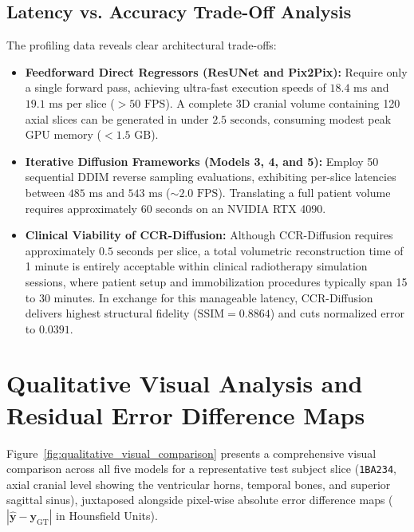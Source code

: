 \subsection{Latency vs. Accuracy Trade-Off Analysis}
The profiling data reveals clear architectural trade-offs:
\begin{itemize}
    \item \textbf{Feedforward Direct Regressors (ResUNet and Pix2Pix):} Require only a single forward pass, achieving ultra-fast execution speeds of $18.4\text{ ms}$ and $19.1\text{ ms}$ per slice ($> 50\text{ FPS}$). A complete 3D cranial volume containing 120 axial slices can be generated in under $2.5\text{ seconds}$, consuming modest peak GPU memory ($< 1.5\text{ GB}$).
    \item \textbf{Iterative Diffusion Frameworks (Models 3, 4, and 5):} Employ 50 sequential DDIM reverse sampling evaluations, exhibiting per-slice latencies between $485\text{ ms}$ and $543\text{ ms}$ ($\sim 2.0\text{ FPS}$). Translating a full patient volume requires approximately $60\text{ seconds}$ on an NVIDIA RTX 4090.
    \item \textbf{Clinical Viability of CCR-Diffusion:} Although CCR-Diffusion requires approximately $0.5\text{ seconds}$ per slice, a total volumetric reconstruction time of 1 minute is entirely acceptable within clinical radiotherapy simulation sessions, where patient setup and immobilization procedures typically span 15 to 30 minutes. In exchange for this manageable latency, CCR-Diffusion delivers highest structural fidelity ($\text{SSIM} = \mathbf{0.8864}$) and cuts normalized error to $\mathbf{0.0391}$.
\end{itemize}

\section{Qualitative Visual Analysis and Residual Error Difference Maps}
Figure~\ref{fig:qualitative_visual_comparison} presents a comprehensive visual comparison across all five models for a representative test subject slice (\texttt{1BA234}, axial cranial level showing the ventricular horns, temporal bones, and superior sagittal sinus), juxtaposed alongside pixel-wise absolute error difference maps ($|\mathbf{\hat{y}} - \mathbf{y}_{\text{GT}}|$ in Hounsfield Units).

